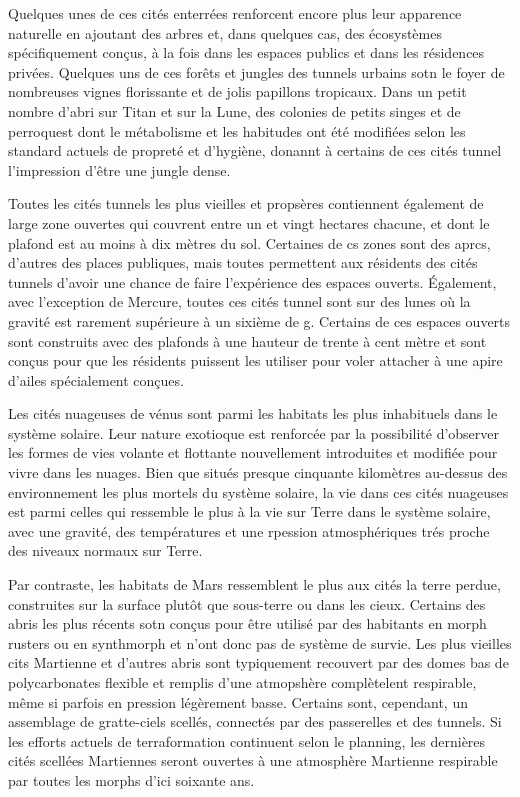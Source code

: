 Quelques unes de ces cités enterrées renforcent encore plus leur apparence naturelle en ajoutant des arbres et, dans quelques cas, des écosystèmes spécifiquement conçus, à la fois dans les espaces publics et dans les résidences privées. Quelques uns de ces forêts et jungles des tunnels urbains sotn le foyer de nombreuses vignes florissante et de jolis papillons tropicaux. Dans un petit nombre d'abri sur Titan et sur la Lune, des colonies de petits singes et de perroquest dont le métabolisme et les habitudes ont été modifiées selon les standard actuels de propreté et d'hygiène, donannt à certains de ces cités tunnel l'impression d'être une jungle dense. 

Toutes les cités tunnels les plus vieilles et propsères contiennent également de large zone ouvertes qui couvrent entre un et vingt hectares chacune, et dont le plafond est au moins à dix mètres du sol. Certaines de cs zones sont des aprcs, d'autres des places publiques, mais toutes permettent aux résidents des cités tunnels d'avoir une chance de faire l'expérience des espaces ouverts. Également, avec l'exception de Mercure, toutes ces cités tunnel sont sur des lunes où la gravité est rarement supérieure à un sixième de g. Certains de ces espaces ouverts sont construits avec des plafonds à une hauteur de trente à cent mètre et sont conçus pour que les résidents puissent les utiliser pour voler attacher à une apire d'ailes spécialement conçues. 

Les cités nuageuses de vénus sont parmi les habitats les plus inhabituels dans le système solaire. Leur nature exotioque est renforcée par la possibilité d'observer les formes de vies volante et flottante nouvellement introduites et modifiée pour vivre dans les nuages. Bien que situés presque cinquante kilomètres au-dessus des environnement les plus mortels du système solaire, la vie dans ces cités nuageuses est parmi celles qui ressemble le plus à la vie sur Terre  dans le système solaire, avec une gravité, des températures et une rpession atmosphériques trés proche des niveaux normaux sur Terre. 

Par contraste, les habitats de Mars ressemblent le plus aux cités la terre perdue, construites sur la surface plutôt que sous-terre ou dans les cieux. Certains des abris les plus récents sotn conçus pour être utilisé par des habitants en morph rusters ou en synthmorph et n'ont donc pas de système de survie. Les plus vieilles cits Martienne et d'autres abris sont typiquement recouvert par des domes bas de polycarbonates flexible et remplis d'une atmopshère complètelent respirable, même si parfois en pression légèrement basse. Certains sont, cependant, un assemblage de gratte-ciels scellés, connectés par des passerelles et des tunnels. Si les efforts actuels de terraformation continuent selon le planning, les dernières cités scellées Martiennes seront ouvertes à une atmosphère Martienne respirable par toutes les morphs d'ici soixante ans. 

